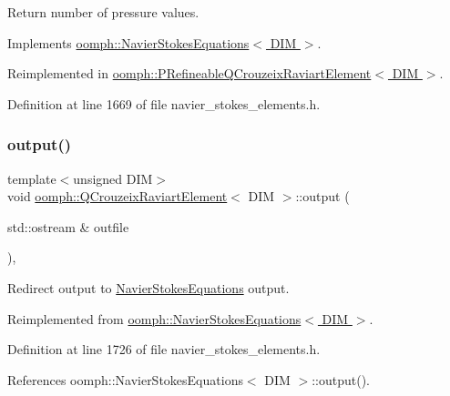 Return number of pressure values. 



Implements \hyperlink{classoomph_1_1NavierStokesEquations_a4a17a76873bf3131d1e0acc74fb1c2d8}{oomph\+::\+Navier\+Stokes\+Equations$<$ D\+I\+M $>$}.



Reimplemented in \hyperlink{classoomph_1_1PRefineableQCrouzeixRaviartElement_a6431bb5f74022a94d074d04ba2f4c7a1}{oomph\+::\+P\+Refineable\+Q\+Crouzeix\+Raviart\+Element$<$ D\+I\+M $>$}.



Definition at line 1669 of file navier\+\_\+stokes\+\_\+elements.\+h.

\mbox{\label{classoomph_1_1QCrouzeixRaviartElement_a0d152892ee354f495bbaced9e423b541}} 
\subsubsection{\texorpdfstring{output()}{output()}\hspace{0.1cm}{\footnotesize\ttfamily [1/4]}}
{\footnotesize\ttfamily template$<$unsigned D\+IM$>$ \\
void \hyperlink{classoomph_1_1QCrouzeixRaviartElement}{oomph\+::\+Q\+Crouzeix\+Raviart\+Element}$<$ D\+IM $>$\+::output (\begin{DoxyParamCaption}\item[{std\+::ostream \&}]{outfile }\end{DoxyParamCaption})\hspace{0.3cm}{\ttfamily [inline]}, {\ttfamily [virtual]}}



Redirect output to \hyperlink{classoomph_1_1NavierStokesEquations}{Navier\+Stokes\+Equations} output. 



Reimplemented from \hyperlink{classoomph_1_1NavierStokesEquations_ae2c8742419aae8961eb34dad989c69b9}{oomph\+::\+Navier\+Stokes\+Equations$<$ D\+I\+M $>$}.



Definition at line 1726 of file navier\+\_\+stokes\+\_\+elements.\+h.



References oomph\+::\+Navier\+Stokes\+Equations$<$ D\+I\+M $>$\+::output().

